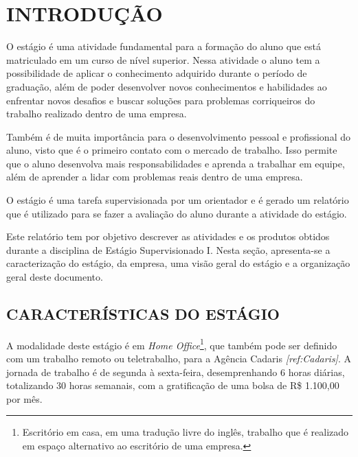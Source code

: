 \documentclass[
  12pt,				%
  openany,
  oneside,
  a4paper,			%
  english,			%
  brazil
]{article}
\numberwithin{figure}{section}
\numberwithin{table}{section}
\begin{document}

\begin{titlepage}

\begin{center}
  \begin{singlespace}
    \tableofcontents
  \end{singlespace}
\end{center}

\end{titlepage}



\section{INTRODUÇÃO}

O estágio é uma atividade fundamental para a formação do aluno que está matriculado em um curso de nível superior. Nessa atividade o aluno tem a possibilidade de aplicar o conhecimento adquirido durante o período de graduação, além de poder desenvolver novos conhecimentos e habilidades ao enfrentar novos desafios e buscar soluções para problemas corriqueiros do trabalho realizado dentro de uma empresa.

Também é de muita importância para o desenvolvimento pessoal e profissional do aluno, visto que é o primeiro contato com o mercado de trabalho. Isso permite que o aluno desenvolva mais responsabilidades e aprenda a trabalhar em equipe, além de aprender a lidar com problemas reais dentro de uma empresa.

O estágio é uma tarefa supervisionada por um orientador e é gerado um relatório que é utilizado para se fazer a avaliação do aluno durante a atividade do estágio.

Este relatório tem por objetivo descrever as atividades e os produtos obtidos durante a disciplina de Estágio Supervisionado I. Nesta seção, apresenta-se a caracterização do estágio, da empresa, uma visão geral do estágio e a organização geral deste documento.


\subsection{CARACTERÍSTICAS DO ESTÁGIO}

A modalidade deste estágio é em \textit{Home Office}\footnote{Escritório em casa, em uma tradução livre do inglês, trabalho que é realizado em espaço alternativo ao escritório de uma empresa.}, que também pode ser definido com um trabalho remoto ou teletrabalho, para a Agência Cadaris \textit{[ref:Cadaris]}. A jornada de trabalho é de segunda à sexta-feira, desemprenhando 6 horas diárias, totalizando 30 horas semanais, com a gratificação de uma bolsa de R\$ 1.100,00 por mês.
\end{document}
